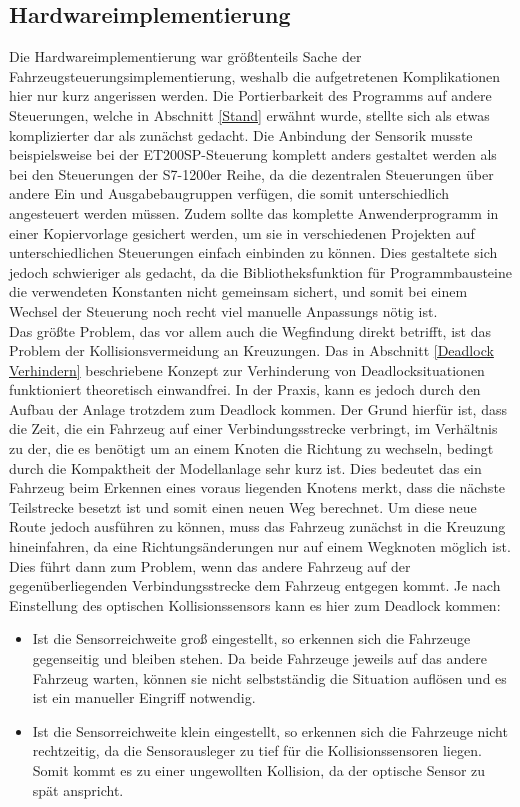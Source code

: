 	\subsection{Hardwareimplementierung}
		\label{Probleme_Hardware}
		Die Hardwareimplementierung war größtenteils Sache der Fahrzeugsteuerungsimplementierung, weshalb die aufgetretenen Komplikationen hier nur kurz angerissen werden. Die Portierbarkeit des Programms auf andere Steuerungen, welche in Abschnitt \ref{Stand} erwähnt wurde, stellte sich als etwas komplizierter dar als zunächst gedacht. Die Anbindung der Sensorik musste beispielsweise bei der ET200SP-Steuerung komplett anders gestaltet werden als bei den Steuerungen der S7-1200er Reihe, da die dezentralen Steuerungen über andere Ein und Ausgabebaugruppen verfügen, die somit unterschiedlich angesteuert werden müssen. Zudem sollte das komplette Anwenderprogramm in einer Kopiervorlage gesichert werden, um sie in verschiedenen Projekten auf unterschiedlichen Steuerungen einfach einbinden zu können. Dies gestaltete sich jedoch schwieriger als gedacht, da die Bibliotheksfunktion für Programmbausteine die verwendeten Konstanten nicht gemeinsam sichert, und somit bei einem Wechsel der Steuerung noch recht viel manuelle Anpassungs nötig ist.
		\\[4pt]
		Das größte Problem, das vor allem auch die Wegfindung direkt betrifft, ist das Problem der Kollisionsvermeidung an Kreuzungen. Das in Abschnitt \ref{Deadlock Verhindern} beschriebene Konzept zur Verhinderung von Deadlocksituationen funktioniert theoretisch einwandfrei. In der Praxis, kann es jedoch durch den Aufbau der Anlage trotzdem zum Deadlock kommen. Der Grund hierfür ist, dass die Zeit, die ein Fahrzeug auf einer Verbindungsstrecke verbringt, im Verhältnis zu der, die es benötigt um an einem Knoten die Richtung zu wechseln, bedingt durch die Kompaktheit der Modellanlage sehr kurz ist. Dies bedeutet das ein Fahrzeug beim Erkennen eines voraus liegenden Knotens merkt, dass die nächste Teilstrecke besetzt ist und somit einen neuen Weg berechnet. Um diese neue Route jedoch ausführen zu können, muss das Fahrzeug zunächst in die Kreuzung hineinfahren, da eine Richtungsänderungen nur auf einem Wegknoten möglich ist. Dies führt dann zum Problem, wenn das andere Fahrzeug auf der gegenüberliegenden Verbindungsstrecke dem Fahrzeug entgegen kommt. Je nach Einstellung des optischen Kollisionssensors kann es hier zum Deadlock kommen:
		
		\begin{itemize}
			\item Ist die Sensorreichweite groß eingestellt, so erkennen sich die Fahrzeuge gegenseitig und bleiben stehen. Da beide Fahrzeuge jeweils auf das andere Fahrzeug warten, können sie nicht selbstständig die Situation auflösen und es ist ein manueller Eingriff notwendig.
			\item Ist die Sensorreichweite klein eingestellt, so erkennen sich die Fahrzeuge nicht rechtzeitig, da die Sensorausleger zu tief für die Kollisionssensoren liegen. Somit kommt es zu einer ungewollten Kollision, da der optische Sensor zu spät anspricht.
		\end{itemize}
		
